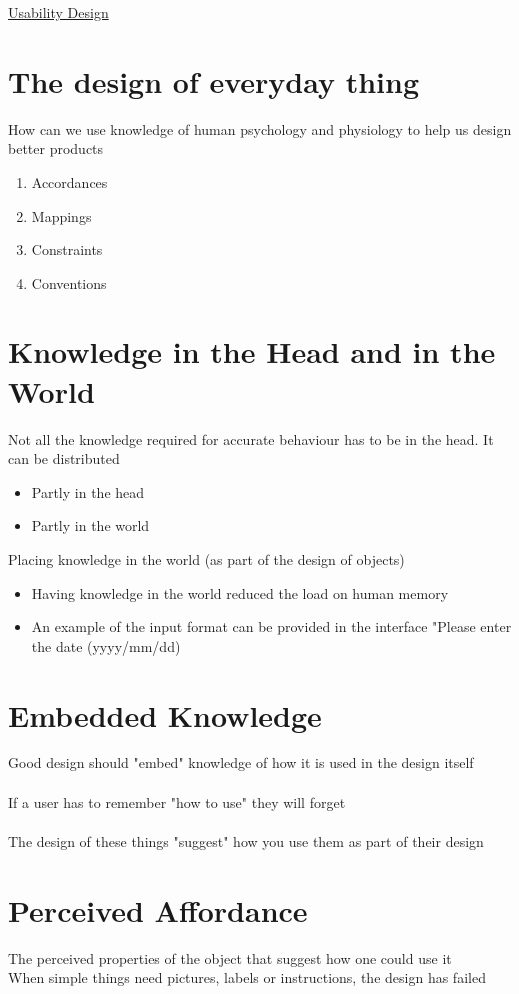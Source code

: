 \documentclass{article}[18pt]
\begin{document}
\begin{center}
\underline{\huge Usability Design}
\end{center}
\section{The design of everyday thing}
How can we use knowledge of human psychology and physiology to help us design better products
\begin{enumerate}
	\item Accordances
	\item Mappings
	\item Constraints
	\item Conventions
\end{enumerate}
\section{Knowledge in the Head and in the World}
Not all the knowledge required for accurate behaviour has to be in the head. It can be distributed
\begin{itemize}
	\item Partly in the head
	\item Partly in the world
\end{itemize}
Placing knowledge in the world (as part of the design of objects)
\begin{itemize}
	\item Having knowledge in the world reduced the load on human memory
	\item An example of the input format can be provided in the interface "Please enter the date (yyyy/mm/dd)
\end{itemize}
\section{Embedded Knowledge}
Good design should "embed" knowledge of how it is used in the design itself\\
\\
If a user has to remember "how to use" they will forget\\
\\
The design of these things "suggest" how you use them as part of their design
\section{Perceived Affordance}
The perceived properties of the object that suggest how one could use it\\
When simple things need pictures, labels or instructions, the design has failed
\end{document}
